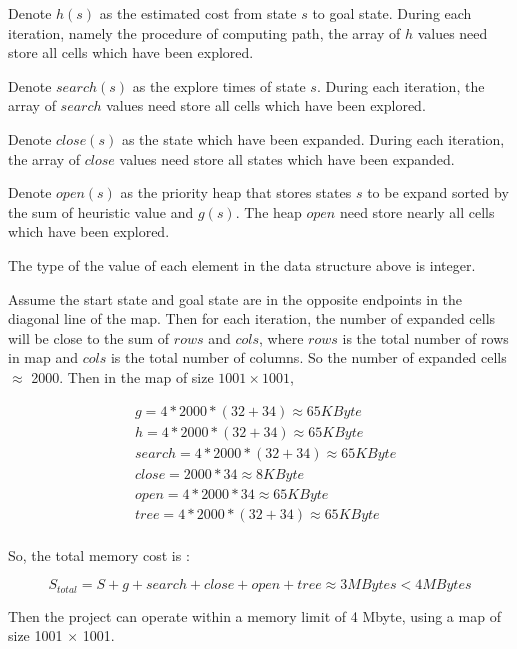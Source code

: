 Denote $h(s)$ as the estimated cost from state $s$ to goal state. During each
iteration, namely the procedure of computing path, the array of $h$ values need
store all cells which have been explored. 

Denote $search(s)$ as the explore times of state $s$. During each iteration,
the array of $search$ values need store all cells which have been explored. 

Denote $close(s)$ as the state which have been expanded. During each iteration,
the array of $close$ values need store all states which have been expanded.

Denote $open(s)$ as the priority heap that stores states $s$ to be expand
sorted by the sum of heuristic value and $g(s)$. The heap $open$ need store
nearly all cells which have been explored. 

The type of the value of each element in the data structure above is integer.

Assume the start state and goal state are in the opposite endpoints in the
diagonal line of the map. Then for each iteration, the number of expanded cells
will be close to the sum of $rows$ and $cols$, where $rows$ is the total number
of rows in map and $cols$ is the total number of columns. So the number of
expanded cells $\approx$ 2000. Then in the map of size $1001 \times 1001$, 

\begin{equation*}
  \begin{aligned}
   &g = 4 * 2000 * (32 + 34) \approx 65 KByte\\
   &h = 4 * 2000 * (32 + 34) \approx 65 KByte\\
   &search = 4 * 2000 * (32 + 34) \approx 65 KByte\\
   &close = 2000 * 34 \approx 8 KByte\\
   &open = 4 * 2000 * 34 \approx 65 KByte\\
   &tree = 4 * 2000 * (32 + 34) \approx 65 KByte\\
  \end{aligned}
\end{equation*}

So, the total memory cost is : 

$$S_{total} = S +  g + search + close + open + tree \approx 3 MBytes < 4MBytes$$

Then the project can operate within a memory limit of 4 Mbyte, using a map of
size 1001 $\times$ 1001.
